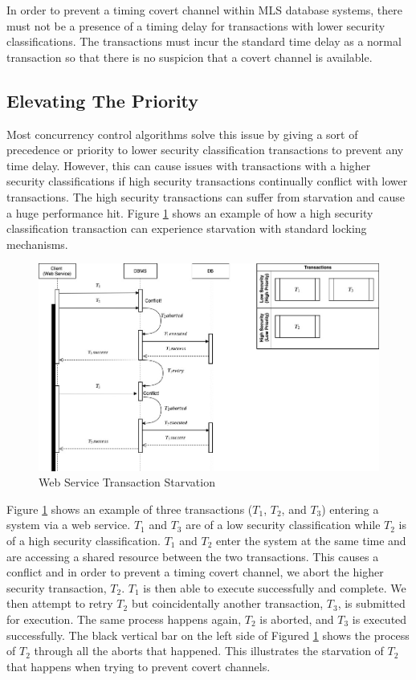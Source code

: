 In order to prevent a timing covert channel within \ac{MLS} database systems, there must not be a presence of a timing delay for transactions with lower security classifications. The transactions must incur the standard time delay as a normal transaction so that there is no suspicion that a covert channel is available.

\subsection{Elevating The Priority}
\label{mls:problem_definition_elevation}
Most concurrency control algorithms solve this issue by giving a sort of precedence or priority to lower security classification transactions to prevent any time delay. However, this can cause issues with transactions with a higher security classifications if high security transactions continually conflict with lower transactions. The high security transactions can suffer from starvation and cause a huge performance hit. Figure \ref{fig:ws_trans_starvation} shows an example of how a high security classification transaction can experience starvation with standard locking mechanisms.

\begin{figure}
\centering
\includegraphics[scale=0.45]{images/TransactionStarvation.jpg}
\caption{Web Service Transaction Starvation}
\label{fig:ws_trans_starvation}
\end{figure}

Figure \ref{fig:ws_trans_starvation} shows an example of three transactions ($T_1$, $T_2$, and $T_3$) entering a system via a web service. $T_1$ and $T_3$ are of a low security classification while $T_2$ is of a high security classification. $T_1$ and $T_2$ enter the system at the same time and are accessing a shared resource between the two transactions. This causes a conflict and in order to prevent a timing covert channel, we abort the higher security transaction, $T_2$. $T_1$ is then able to execute successfully and complete. We then attempt to retry $T_2$ but coincidentally another transaction, $T_3$, is submitted for execution. The same process happens again, $T_2$ is aborted, and $T_3$ is executed successfully. The black vertical bar on the left side of Figured \ref{fig:ws_trans_starvation} shows the process of $T_2$ through all the aborts that happened. This illustrates the starvation of $T_2$ that happens when trying to prevent covert channels.

